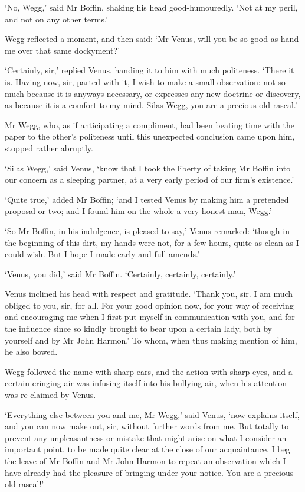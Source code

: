 ‘No, Wegg,’ said Mr Boffin, shaking his head good-humouredly. ‘Not at my
peril, and not on any other terms.’

Wegg reflected a moment, and then said: ‘Mr Venus, will you be so good
as hand me over that same dockyment?’

‘Certainly, sir,’ replied Venus, handing it to him with much politeness.
‘There it is. Having now, sir, parted with it, I wish to make a small
observation: not so much because it is anyways necessary, or expresses
any new doctrine or discovery, as because it is a comfort to my mind.
Silas Wegg, you are a precious old rascal.’

Mr Wegg, who, as if anticipating a compliment, had been beating
time with the paper to the other’s politeness until this unexpected
conclusion came upon him, stopped rather abruptly.

‘Silas Wegg,’ said Venus, ‘know that I took the liberty of taking Mr
Boffin into our concern as a sleeping partner, at a very early period of
our firm’s existence.’

‘Quite true,’ added Mr Boffin; ‘and I tested Venus by making him a
pretended proposal or two; and I found him on the whole a very honest
man, Wegg.’

‘So Mr Boffin, in his indulgence, is pleased to say,’ Venus remarked:
‘though in the beginning of this dirt, my hands were not, for a few
hours, quite as clean as I could wish. But I hope I made early and full
amends.’

‘Venus, you did,’ said Mr Boffin. ‘Certainly, certainly, certainly.’

Venus inclined his head with respect and gratitude. ‘Thank you, sir.
I am much obliged to you, sir, for all. For your good opinion now, for
your way of receiving and encouraging me when I first put myself in
communication with you, and for the influence since so kindly brought
to bear upon a certain lady, both by yourself and by Mr John Harmon.’ To
whom, when thus making mention of him, he also bowed.

Wegg followed the name with sharp ears, and the action with sharp eyes,
and a certain cringing air was infusing itself into his bullying air,
when his attention was re-claimed by Venus.

‘Everything else between you and me, Mr Wegg,’ said Venus, ‘now explains
itself, and you can now make out, sir, without further words from me.
But totally to prevent any unpleasantness or mistake that might arise on
what I consider an important point, to be made quite clear at the close
of our acquaintance, I beg the leave of Mr Boffin and Mr John Harmon to
repeat an observation which I have already had the pleasure of bringing
under your notice. You are a precious old rascal!’

